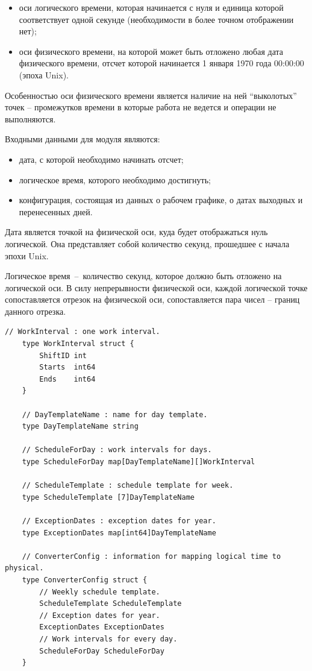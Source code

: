 \begin{itemize}
	\item оси логического времени, которая начинается с нуля и единица которой соответствует одной секунде (необходимости в более точном отображении нет);
	\item оси физического времени, на которой может быть отложено любая дата физического времени, отсчет которой начинается 1 января 1970 года 00:00:00 (эпоха Unix).
\end{itemize}

\indent Особенностью оси физического времени является наличие на ней ``выколотых'' точек -- промежутков времени в которые работа не ведется и операции не выполняются.

\indent Входными данными для модуля являются:

\begin{itemize}
	\item дата, с которой необходимо начинать отсчет;
	\item логическое время, которого необходимо достигнуть;
	\item конфигурация, состоящая из данных о рабочем графике, о датах выходных и перенесенных дней.
\end{itemize}

\indent Дата является точкой на физической оси, куда будет отображаться нуль логической. Она представляет собой количество секунд, прошедшее с начала эпохи Unix.

\indent Логическое время~--~количество секунд, которое должно быть отложено на логической оси. В силу непрерывности физической оси, каждой логической точке сопоставляется отрезок на физической оси, сопоставляется пара чисел -- границ данного отрезка.

\begin{lstlisting}[caption={Структуры конфигурации},label={lst:configStruct},language=Golang]
	// WorkInterval : one work interval.
	type WorkInterval struct {
		ShiftID int
		Starts  int64
		Ends    int64
	}
	
	// DayTemplateName : name for day template.
	type DayTemplateName string

	// ScheduleForDay : work intervals for days.
	type ScheduleForDay map[DayTemplateName][]WorkInterval

	// ScheduleTemplate : schedule template for week.
	type ScheduleTemplate [7]DayTemplateName

	// ExceptionDates : exception dates for year.
	type ExceptionDates map[int64]DayTemplateName

	// ConverterConfig : information for mapping logical time to physical.
	type ConverterConfig struct {
		// Weekly schedule template.
		ScheduleTemplate ScheduleTemplate
		// Exception dates for year.
		ExceptionDates ExceptionDates
		// Work intervals for every day.
		ScheduleForDay ScheduleForDay
	}
\end{lstlisting}

